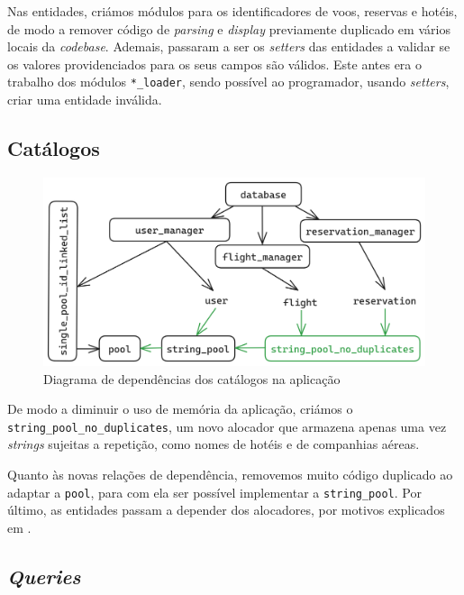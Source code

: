 \documentclass[11pt, a4paper]{article}
\begin{document}
Nas entidades, criámos módulos para os identificadores de voos, reservas e hotéis, de modo a remover
código de \emph{parsing} e \emph{display} previamente duplicado em vários locais da \emph{codebase}.
Ademais, passaram a ser os \emph{setters} das entidades a validar se os valores providenciados para
os seus campos são válidos. Este antes era o trabalho dos módulos \texttt{*\_loader}, sendo possível
ao programador, usando \emph{setters}, criar uma entidade inválida.

\subsection{Catálogos}
\label{sec:catalogs}

\begin{figure}[ht]
    \centering
    \includegraphics[scale=0.17]{res-fase2/database.png}
    \caption{Diagrama de dependências dos catálogos na aplicação}
    \label{fig:catalogs}
\end{figure}

De modo a diminuir o uso de memória da aplicação, criámos o \texttt{string\_pool\_no\_duplicates},
um novo alocador que armazena apenas uma vez \emph{strings} sujeitas a repetição, como nomes de
hotéis e de companhias aéreas.

Quanto às novas relações de dependência, removemos muito código duplicado ao adaptar a
\texttt{pool}, para com ela ser possível implementar a \texttt{string\_pool}. Por último, as
entidades passam a depender dos alocadores, por motivos explicados em
.

\subsection{\emph{Queries}}
\label{sec:queries}
\end{document}
